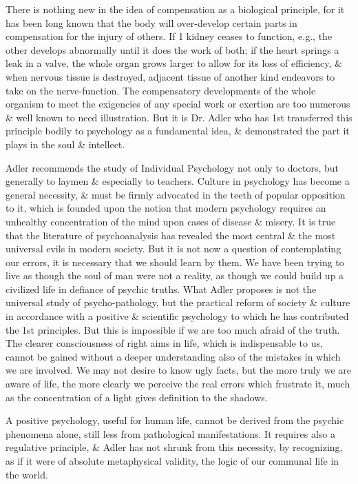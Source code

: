 \documentclass{article}
\begin{document}
There is nothing new in the idea of compensation as a biological principle, for it has been long known that the body will over-develop certain parts in compensation for the injury of others. If 1 kidney ceases to function, e.g., the other develops abnormally until it does the work of both; if the heart springs a leak in a valve, the whole organ grows larger to allow for its loss of efficiency, \& when nervous tissue is destroyed, adjacent tissue of another kind endeavors to take on the nerve-function. The compensatory developments of the whole organism to meet the exigencies of any special work or exertion are too numerous \& well known to need illustration. But it is Dr. Adler who has 1st transferred this principle bodily to psychology as a fundamental idea, \& demonstrated the part it plays in the soul \& intellect.

Adler recommends the study of Individual Psychology not only to doctors, but generally to laymen \& especially to teachers. Culture in psychology has become a general necessity, \& must be firmly advocated in the teeth of popular opposition to it, which is founded upon the notion that modern psychology requires an unhealthy concentration of the mind upon cases of disease \& misery. It is true that the literature of psychoanalysis has revealed the most central \& the most universal evils in modern society. But it is not now a question of contemplating our errors, it is necessary that we should learn by them. We have been trying to live as though the soul of man were not a reality, as though we could build up a civilized life in defiance of psychic truths. What Adler proposes is not the universal study of psycho-pathology, but the practical reform of society \& culture in accordance with a positive \& scientific psychology to which he has contributed the 1st principles. But this is impossible if we are too much afraid of the truth. The clearer consciousness of right aims in life, which is indispensable to us, cannot be gained without a deeper understanding also of the mistakes in which we are involved. We may not desire to know ugly facts, but the more truly we are aware of life, the more clearly we perceive the real errors which frustrate it, much as the concentration of a light gives definition to the shadows.

A positive psychology, useful for human life, cannot be derived from the psychic phenomena alone, still less from pathological manifestations. It requires also a regulative principle, \& Adler has not shrunk from this necessity, by recognizing, as if it were of absolute metaphysical validity, the logic of our communal life in the world.
\end{document}
